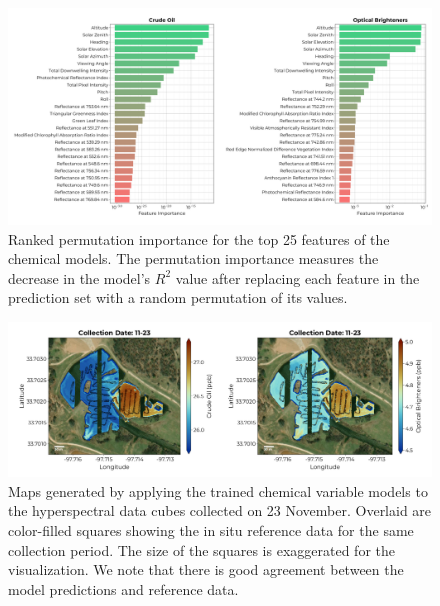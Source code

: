 \documentclass[remotesensing,article,accept,pdftex,moreauthors]{Definitions/mdpi}
\begin{document}
\vspace{-9pt}
\begin{figure}[H]
\vspace{-0.15in}
\hspace{-6pt}\includegraphics[width=\columnwidth]{figures/results/fits/chemical-ranking.pdf}
\vspace{-0.15in}
\caption{Ranked permutation importance for the top 25 features of the chemical models. The permutation importance measures the decrease in the model's $R^2$ value after replacing each feature in the prediction set with a random permutation of its values.\label{fig:chemicals-fi}}
\end{figure}  

\begin{figure}[H]

\vspace{-0.2in}
\hspace{-6pt}\includegraphics[width=\columnwidth]{figures/results/maps/chemical.pdf}
\vspace{-0.1in}
\caption{Maps generated by applying the trained chemical variable models to the hyperspectral data cubes collected on 23 November. Overlaid are color-filled squares showing the in situ reference data for the same collection period. The size of the squares is exaggerated for the visualization. We note that there is good agreement between the model predictions and reference data.\label{fig:map-chem}}
\end{figure} 
\end{document}
